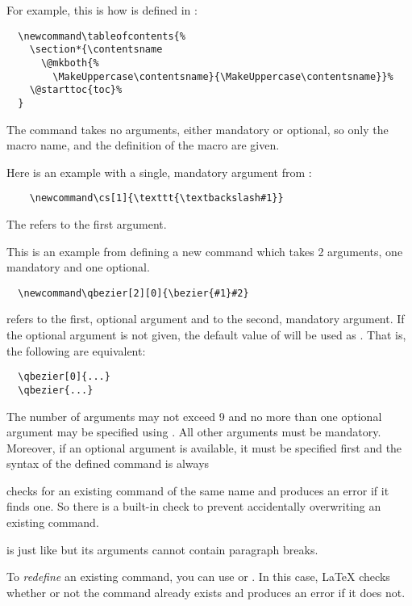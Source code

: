 For example, this is how  is defined in :

\begin{verbatim}
  \newcommand\tableofcontents{%
    \section*{\contentsname
      \@mkboth{%
        \MakeUppercase\contentsname}{\MakeUppercase\contentsname}}%
    \@starttoc{toc}%
  }
\end{verbatim}
The command takes no arguments, either mandatory or optional, so only the macro name,  and the definition of the macro are given.

Here is an example with a single, mandatory argument from :
\begin{verbatim}
    \newcommand\cs[1]{\texttt{\textbackslash#1}}
\end{verbatim}
The \narg{} refers to the first argument.

This is an example from  defining a new command which takes 2 arguments, one mandatory and one optional.
\begin{verbatim}
  \newcommand\qbezier[2][0]{\bezier{#1}#2}
\end{verbatim}
\narg{} refers to the first, optional argument and \narg[2] to the second, mandatory argument.
If the optional argument is not given, the default value of  will be used as \narg.
That is, the following are equivalent:
\begin{verbatim}
  \qbezier[0]{...}
  \qbezier{...}
\end{verbatim}


The number of arguments may not exceed 9 and no more than one optional argument may be specified using .
All other arguments must be mandatory.
Moreover, if an optional argument is available, it must be specified first and the syntax of the defined command is always

 checks for an existing command of the same name and produces an error if it finds one.
So there is a built-in check to prevent accidentally overwriting an existing command.

 is just like  but its arguments cannot contain paragraph breaks.

To \emph{redefine} an existing command, you can use  or .
In this case, \LaTeX{} checks whether or not the command already exists and produces an error if it does not.

